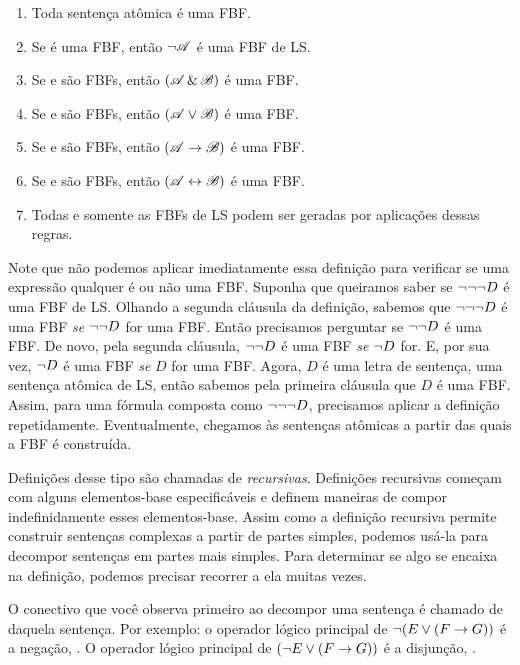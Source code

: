 \begin{enumerate}
\item Toda sentença atômica é uma FBF.
\item Se  é uma FBF, então $\neg\mathscr{A}$ é uma FBF de LS.
\item Se  e  são FBFs, então $(\mathscr{A}\,\&\,\mathscr{B})$ é uma FBF.
\item Se  e  são FBFs, então $(\mathscr{A}\vee\mathscr{B})$ é uma FBF.
\item Se  e  são FBFs, então $(\mathscr{A}\rightarrow\mathscr{B})$ é uma FBF.
\item Se  e  são FBFs, então $(\mathscr{A}\leftrightarrow\mathscr{B})$ é uma FBF.
\item Todas e somente as FBFs de LS podem ser geradas por aplicações dessas regras.
\end{enumerate}

Note que não podemos aplicar imediatamente essa definição para verificar se uma expressão qualquer é ou não uma FBF. Suponha que queiramos saber se $\neg \neg \neg D$ é uma FBF de LS. Olhando a segunda cláusula da definição, sabemos que $\neg \neg \neg D$ é uma FBF \emph{se} $\neg \neg D$ for uma FBF. Então precisamos perguntar se $\neg \neg D$ é uma FBF. De novo, pela segunda cláusula, $\neg \neg D$ é uma FBF \emph{se} $\neg D$ for. E, por sua vez, $\neg D$ é uma FBF \emph{se} $D$ for uma FBF. Agora, $D$ é uma letra de sentença, uma sentença atômica de LS, então sabemos pela primeira cláusula que $D$ é uma FBF. Assim, para uma fórmula composta como $\neg \neg \neg D$, precisamos aplicar a definição repetidamente. Eventualmente, chegamos às sentenças atômicas a partir das quais a FBF é construída.

Definições desse tipo são chamadas de \emph{recursivas}. Definições recursivas começam com alguns elementos-base especificáveis e definem maneiras de compor indefinidamente esses elementos-base. Assim como a definição recursiva permite construir sentenças complexas a partir de partes simples, podemos usá-la para decompor sentenças em partes mais simples. Para determinar se algo se encaixa na definição, podemos precisar recorrer a ela muitas vezes.

O conectivo que você observa primeiro ao decompor uma sentença é chamado de  daquela sentença. Por exemplo: o operador lógico principal de $\neg (E \vee (F \rightarrow G))$ é a negação, \enot. O operador lógico principal de $(\neg E \vee (F \rightarrow G))$ é a disjunção, \eor.


